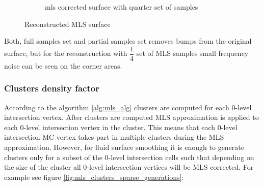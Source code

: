 \begin{figure}
\begin{center}
\begin{subfigure}[b]{\textwidth}
			\caption{mls corrected surface with quarter set of samples}
		\end{subfigure}
	\end{center}
	\caption{Reconstructed MLS surface} \label{fig:surface_sampling_results}
\end{figure}
Both, full samples set and partial samples set removes bumps from the original surface, but for the reconstruction with $\dfrac{1}{4}$ set of MLS samples small frequency noise can be seen on the corner areas.


\subsubsection{Clusters density factor} \label{sec:clusterDencityFactor}
According to the algorithm \ref{alg:mls_alg} clusters are computed for each 0-level intersection vertex. After clusters are computed MLS approximation is applied to each 0-level intersection vertex in the cluster. This means that each 0-level intersection MC vertex takes part in multiple clusters during the MLS approximation. However, for fluid surface smoothing it is enough to generate clusters only for a subset of the 0-level intersection cells such that depending on the size of the cluster all 0-level intersection vertices will be MLS corrected. For example see figure \ref{fig:mls_clusters_sparse_generations}:
